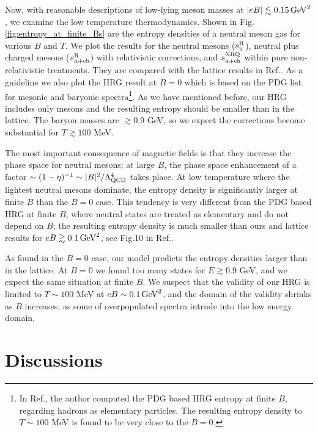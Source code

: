 Now, with reasonable descriptions of low-lying meson masses at $|eB| \lesssim 0.15\, {\rm GeV}^2$, 
we examine the low temperature thermodynamics.
Shown in Fig.\ref{fig:entropy_at_finite_Bs} are the entropy densities of a neutral meson gas for various $B$ and $T$. 
We plot the results for the neutral mesons ($s_{\rm n}^{\rm R}$), neutral plus charged mesons ($s_{\rm n+ch}^{\rm R}$) with relativistic corrections, 
and $s_{\rm n+ch}^{\rm NRQ}$ within pure non-relativistic treatments.
They are compared with the lattice results in Ref.\cite{Bali:2014kia}.
As a guideline we also plot the HRG result at $B=0$ which is based on the PDG list for mesonic and baryonic 
spectra\footnote{In 
Ref.\cite{Endrodi:2013cs}, the author computed the PDG based HRG entropy at finite $B$, regarding hadrons as elementary particles.
The resulting entropy density to $T \sim 100$ MeV is found to be very close to the $B=0$.
}.
As we have mentioned before, our HRG includes only mesons and the resulting entropy should be smaller than in the lattice.
The baryon masses are $\gtrsim 0.9$ GeV, so we expect the corrections become substantial for $T\gtrsim 100$ MeV.

The most important consequence of magnetic fields is that they increase the phase space for neutral mesons; 
at large $B$, the phase space enhancement of a factor $\sim (1-\eta)^{-1} \sim |B|^2/\Lambda_{\rm QCD}^4$ takes place.
At low temperature where the lightest neutral mesons dominate, 
the entropy density is significantly larger at finite $B$ than the $B=0$ case. 
This tendency is very different from the PDG based HRG at finite $B$, where neutral states are treated as elementary and do not depend on $B$;
the resulting entropy density is much smaller than ours and lattice results for $eB\gtrsim 0.1\,{\rm GeV}^2$, see Fig.10 in Ref.\cite{Endrodi:2013cs}.

As found in the $B=0$ case, our model predicts the entropy densities larger than in the lattice.
At $B=0$ we found too many states for $E \gtrsim 0.9$ GeV, and we expect the same situation at finite $B$.
We suspect that the validity of our HRG is limited to $T\sim 100$ MeV at $eB\sim 0.1\, {\rm GeV}^2$, 
and the domain of the validity shrinks as $B$ increases,
as some of overpopulated spectra intrude into the low energy domain.





\section{Discussions}
\label{sec:discussions}


